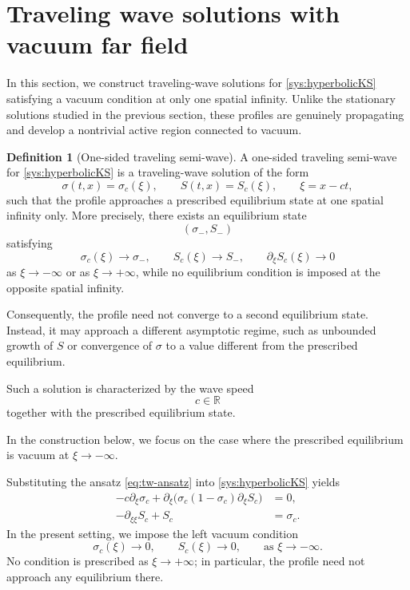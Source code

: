 \documentclass[12pt]{article}
\theoremstyle{definition}
\newtheorem{definition}[theorem]{Definition}
\theoremstyle{remark}
\numberwithin{equation}{section}
\begin{document}
\section{Traveling wave solutions with vacuum far field}
\label{sec:traveling_wave}

In this section, we construct traveling-wave solutions for
\eqref{sys:hyperbolicKS} satisfying a vacuum condition at only one spatial
infinity. Unlike the stationary solutions studied in the previous section,
these profiles are genuinely propagating and develop a nontrivial active region connected to vacuum.

\begin{definition}[One-sided traveling semi-wave]
A one-sided traveling semi-wave for \eqref{sys:hyperbolicKS} is a
traveling-wave solution of the form
\begin{equation}
\label{eq:tw-ansatz}
\sigma(t,x)=\sigma_c(\xi),
\qquad
S(t,x)=S_c(\xi),
\qquad
\xi=x-ct,
\end{equation}
such that the profile approaches a prescribed equilibrium state at one spatial
infinity only. More precisely, there exists an equilibrium state
\[
(\sigma_-,S_-)
\]
satisfying
\[
\sigma_c(\xi)\to\sigma_-,
\qquad
S_c(\xi)\to S_-,
\qquad
\partial_\xi S_c(\xi)\to0
\]
as \(\xi\to-\infty\) or as \(\xi\to+\infty\), while no equilibrium condition
is imposed at the opposite spatial infinity.

Consequently, the profile need not converge to a second equilibrium state.
Instead, it may approach a different asymptotic regime, such as unbounded
growth of \(S\) or convergence of \(\sigma\) to a value different from the
prescribed equilibrium.

Such a solution is characterized by the wave speed
\[
c\in\mathbb R
\]
together with the prescribed equilibrium state.
\end{definition}

In the construction below, we focus on the case where the prescribed
equilibrium is vacuum at
$
\xi\to-\infty
$. 

Substituting the ansatz \eqref{eq:tw-ansatz} into
\eqref{sys:hyperbolicKS} yields
\begin{subequations}
    \label{sys:tw}
\begin{align}
-c\partial_\xi\sigma_c
+\partial_\xi\big(\sigma_c(1-\sigma_c)\partial_\xi S_c\big)
&=0,
\label{eq:tw-01}
\\[4pt]
-\partial_{\xi\xi}S_c+S_c
&=\sigma_c.
\label{eq:tw-02}
\end{align}
\end{subequations}
In the present setting, 
we impose the left vacuum condition
\begin{equation}
\sigma_c(\xi)\to0,
\qquad
S_c(\xi)\to0,
\qquad
\text{as }\xi\to-\infty.
\label{eq:tw-left-vacuum}
\end{equation}
No condition is prescribed as \(\xi\to+\infty\); in particular, the profile
need not approach any equilibrium there.
\end{document}
